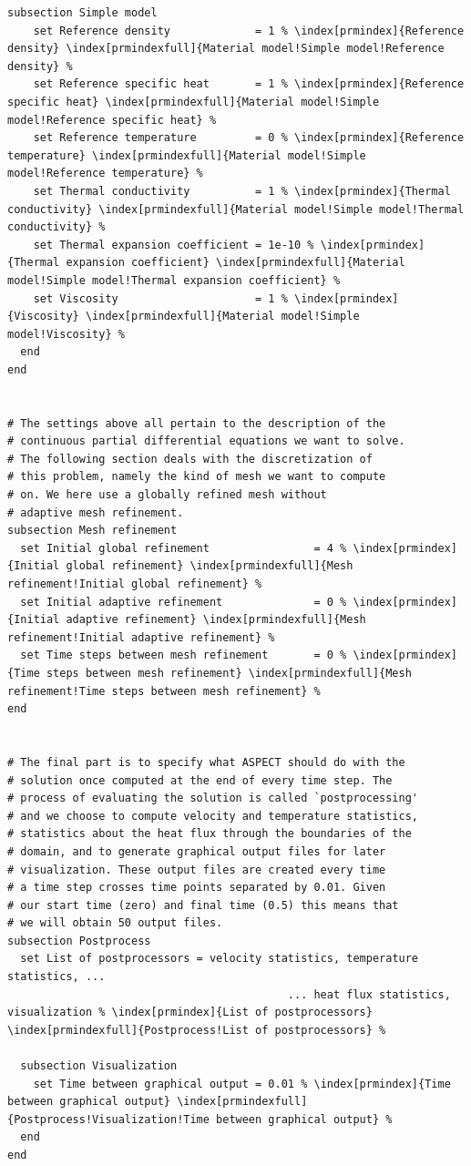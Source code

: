 \documentclass{article}
\begin{document}
\begin{lstlisting}[frame=single,language=prmfile,escapechar=\%]
  subsection Simple model
    set Reference density             = 1 % \index[prmindex]{Reference density} \index[prmindexfull]{Material model!Simple model!Reference density} %
    set Reference specific heat       = 1 % \index[prmindex]{Reference specific heat} \index[prmindexfull]{Material model!Simple model!Reference specific heat} %
    set Reference temperature         = 0 % \index[prmindex]{Reference temperature} \index[prmindexfull]{Material model!Simple model!Reference temperature} %
    set Thermal conductivity          = 1 % \index[prmindex]{Thermal conductivity} \index[prmindexfull]{Material model!Simple model!Thermal conductivity} %
    set Thermal expansion coefficient = 1e-10 % \index[prmindex]{Thermal expansion coefficient} \index[prmindexfull]{Material model!Simple model!Thermal expansion coefficient} %
    set Viscosity                     = 1 % \index[prmindex]{Viscosity} \index[prmindexfull]{Material model!Simple model!Viscosity} %
  end
end


# The settings above all pertain to the description of the
# continuous partial differential equations we want to solve.
# The following section deals with the discretization of
# this problem, namely the kind of mesh we want to compute
# on. We here use a globally refined mesh without
# adaptive mesh refinement.
subsection Mesh refinement
  set Initial global refinement                = 4 % \index[prmindex]{Initial global refinement} \index[prmindexfull]{Mesh refinement!Initial global refinement} %
  set Initial adaptive refinement              = 0 % \index[prmindex]{Initial adaptive refinement} \index[prmindexfull]{Mesh refinement!Initial adaptive refinement} %
  set Time steps between mesh refinement       = 0 % \index[prmindex]{Time steps between mesh refinement} \index[prmindexfull]{Mesh refinement!Time steps between mesh refinement} %
end


# The final part is to specify what ASPECT should do with the
# solution once computed at the end of every time step. The
# process of evaluating the solution is called `postprocessing'
# and we choose to compute velocity and temperature statistics,
# statistics about the heat flux through the boundaries of the
# domain, and to generate graphical output files for later
# visualization. These output files are created every time
# a time step crosses time points separated by 0.01. Given
# our start time (zero) and final time (0.5) this means that
# we will obtain 50 output files.
subsection Postprocess
  set List of postprocessors = velocity statistics, temperature statistics, ...
                                           ... heat flux statistics, visualization % \index[prmindex]{List of postprocessors} \index[prmindexfull]{Postprocess!List of postprocessors} %

  subsection Visualization
    set Time between graphical output = 0.01 % \index[prmindex]{Time between graphical output} \index[prmindexfull]{Postprocess!Visualization!Time between graphical output} %
  end
end
\end{lstlisting}
\end{document}
